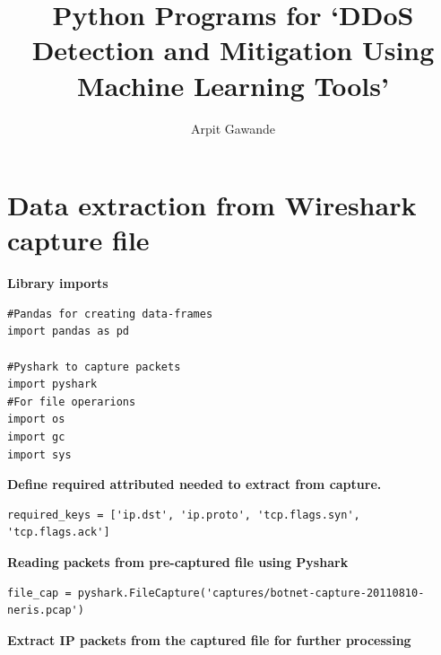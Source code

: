 \documentclass{article}
\begin{document}
\title{Python Programs for `DDoS Detection and Mitigation Using Machine Learning Tools'}
\author{Arpit Gawande}
\maketitle
\newpage
\section{Data extraction from Wireshark capture file}

\textbf{\large{Library imports}}
\begin{verbatim}
#Pandas for creating data-frames
import pandas as pd

#Pyshark to capture packets
import pyshark
#For file operarions
import os
import gc
import sys
\end{verbatim}
\textbf{\large{Define required attributed needed to extract from capture.}}
\begin{verbatim}
required_keys = ['ip.dst', 'ip.proto', 'tcp.flags.syn', 'tcp.flags.ack']
\end{verbatim}
\textbf{\large{Reading packets from pre-captured file using Pyshark}}
\begin{verbatim}
file_cap = pyshark.FileCapture('captures/botnet-capture-20110810-neris.pcap')
\end{verbatim}
\textbf{\large{Extract IP packets from the captured file for further processing}}
\end{document}
